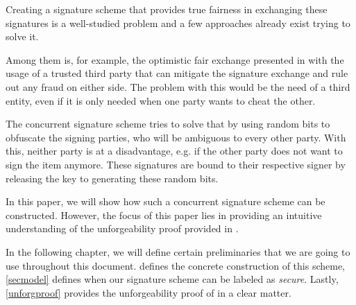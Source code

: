 Creating a signature scheme that provides true fairness in exchanging these signatures is a well-studied problem and a few approaches already exist trying to solve it.

Among them is, for example, the optimistic fair exchange presented in \cite{asokan1998optimistic} with the usage of a trusted third party that can mitigate the signature exchange and rule out any fraud on either side. 
The problem with this would be the need of a third entity, even if it is only needed when one party wants to cheat the other. 

The concurrent signature scheme \cite{chen2004concurrent} tries to solve that by using random bits to obfuscate the signing parties, who will be ambiguous to every other party.
With this, neither party is at a disadvantage, e.g. if the other party does not want to sign the item anymore.
These signatures are bound to their respective signer by releasing the key to generating these random bits.

In this paper, we will show how such a concurrent signature scheme can be constructed.
However, the focus of this paper lies in providing an intuitive understanding of the unforgeability proof provided in \cite{chen2004concurrent}.

In the following chapter, we will define certain preliminaries that we are going to use throughout this document.
 defines the concrete construction of this scheme, \cref{secmodel} defines when our signature scheme can be labeled as \textit{secure}.
Lastly, \cref{unforgproof} provides the unforgeability proof of \cite{chen2004concurrent} in a clear matter.